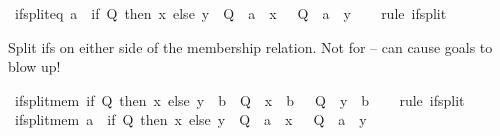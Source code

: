 \begin{isabellebody}
\endisatagproof
{\isafoldproof}%
%
\isadelimproof
\isanewline
%
\endisadelimproof
\isanewline
{}\isamarkupfalse%
\ if{\isacharunderscore}{\kern0pt}split{\isacharunderscore}{\kern0pt}eq{}{\isacharcolon}{\kern0pt}\ {\isachardoublequoteopen}a\ {\isacharequal}{\kern0pt}\ {\isacharparenleft}{\kern0pt}if\ Q\ then\ x\ else\ y{\isacharparenright}{\kern0pt}\ {\isasymlongleftrightarrow}\ {\isacharparenleft}{\kern0pt}Q\ {\isasymlongrightarrow}\ a\ {\isacharequal}{\kern0pt}\ x{\isacharparenright}{\kern0pt}\ {\isasymand}\ {\isacharparenleft}{\kern0pt}{\isasymnot}\ Q\ {\isasymlongrightarrow}\ a\ {\isacharequal}{\kern0pt}\ y{\isacharparenright}{\kern0pt}{\isachardoublequoteclose}\isanewline
%
\isadelimproof
\ \ %
\endisadelimproof
%
\isatagproof
{}\isamarkupfalse%
\ {\isacharparenleft}{\kern0pt}rule\ if{\isacharunderscore}{\kern0pt}split{\isacharparenright}{\kern0pt}%
\endisatagproof
{\isafoldproof}%
%
\isadelimproof
%
\endisadelimproof
%
\begin{isamarkuptext}%
Split ifs on either side of the membership relation.
  Not for  -- can cause goals to blow up!%
\end{isamarkuptext}\isamarkuptrue%
\isamarkupfalse%
\ if{\isacharunderscore}{\kern0pt}split{\isacharunderscore}{\kern0pt}mem{}{\isacharcolon}{\kern0pt}\ {\isachardoublequoteopen}{\isacharparenleft}{\kern0pt}if\ Q\ then\ x\ else\ y{\isacharparenright}{\kern0pt}\ {\isasymin}\ b\ {\isasymlongleftrightarrow}\ {\isacharparenleft}{\kern0pt}Q\ {\isasymlongrightarrow}\ x\ {\isasymin}\ b{\isacharparenright}{\kern0pt}\ {\isasymand}\ {\isacharparenleft}{\kern0pt}{\isasymnot}\ Q\ {\isasymlongrightarrow}\ y\ {\isasymin}\ b{\isacharparenright}{\kern0pt}{\isachardoublequoteclose}\isanewline
%
\isadelimproof
\ \ %
\endisadelimproof
%
\isatagproof
{}\isamarkupfalse%
\ {\isacharparenleft}{\kern0pt}rule\ if{\isacharunderscore}{\kern0pt}split{\isacharparenright}{\kern0pt}%
\endisatagproof
{\isafoldproof}%
%
\isadelimproof
\isanewline
%
\endisadelimproof
\isanewline
{}\isamarkupfalse%
\ if{\isacharunderscore}{\kern0pt}split{\isacharunderscore}{\kern0pt}mem{}{\isacharcolon}{\kern0pt}\ {\isachardoublequoteopen}{\isacharparenleft}{\kern0pt}a\ {\isasymin}\ {\isacharparenleft}{\kern0pt}if\ Q\ then\ x\ else\ y{\isacharparenright}{\kern0pt}{\isacharparenright}{\kern0pt}\ {\isasymlongleftrightarrow}\ {\isacharparenleft}{\kern0pt}Q\ {\isasymlongrightarrow}\ a\ {\isasymin}\ x{\isacharparenright}{\kern0pt}\ {\isasymand}\ {\isacharparenleft}{\kern0pt}{\isasymnot}\ Q\ {\isasymlongrightarrow}\ a\ {\isasymin}\ y{\isacharparenright}{\kern0pt}{\isachardoublequoteclose}\isanewline

\end{isabellebody}
